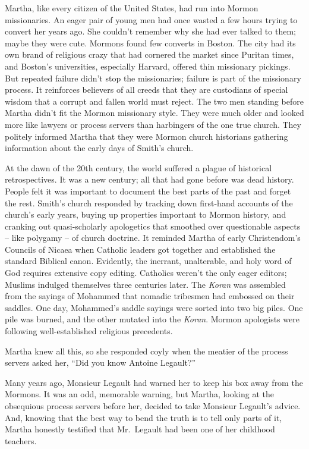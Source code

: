 Martha, like every citizen of the United States, had run into Mormon
missionaries. An eager pair of young men had once wasted a few hours
trying to convert her years ago. She couldn't remember why she had ever
talked to them; maybe they were cute. Mormons found few converts in
Boston. The city had its own brand of religious crazy that had cornered
the market since Puritan times, and Boston's universities, especially
Harvard, offered thin missionary pickings. But repeated failure didn't
stop the missionaries; failure is part of the missionary process. It
reinforces believers of all creeds that they are custodians of special
wisdom that a corrupt and fallen world must reject. The two men standing
before Martha didn't fit the Mormon missionary style. They were much
older and looked more like lawyers or process servers than harbingers of
the one true church. They politely informed Martha that they were Mormon
church historians gathering information about the early days of Smith's
church.

At the dawn of the 20th century, the world suffered a plague of
historical retrospectives. It was a new century; all that had gone
before was dead history. People felt it was important to document the
best parts of the past and forget the rest. Smith's church responded by
tracking down first-hand accounts of the church's early years, buying up
properties important to Mormon history, and cranking out quasi-scholarly
apologetics that smoothed over questionable aspects -- like polygamy --
of church doctrine. It reminded Martha of early Christendom's Councils
of Nicaea when Catholic leaders got together and established the
standard Biblical canon. Evidently, the inerrant, unalterable, and holy
word of God requires extensive copy editing. Catholics weren't the only
eager editors; Muslims indulged themselves three centuries later. The
\emph{Koran} was assembled from the sayings of Mohammed that nomadic
tribesmen had embossed on their saddles. One day, Mohammed's saddle
sayings were sorted into two big piles. One pile was burned, and the
other mutated into the \emph{Koran}. Mormon apologists were following
well-established religious precedents.

Martha knew all this, so she responded coyly when the meatier of the
process servers asked her, ``Did you know Antoine Legault?''

Many years ago, Monsieur Legault had warned her to keep his box away
from the Mormons. It was an odd, memorable warning, but Martha, looking
at the obsequious process servers before her, decided to take Monsieur
Legault's advice. And, knowing that the best way to bend the truth is to
tell only parts of it, Martha honestly testified that Mr.~Legault had
been one of her childhood teachers.

